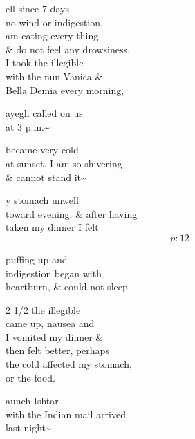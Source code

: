 \documentclass{report}
\begin{document}
	\par{
 	ell since 7 days\ \\no wind or indigestion,\ \\am eating every thing\ \\\& do not feel any drowsiness.\ \\I took the \lbrack illegible\rbrack\ \\with the nun Vanica \&\ \\Bella Demia every morning,\ \\
	}

	\par{
 	ayegh called on us\ \\at 3 p.m.\~{}\ \\
	}

	\par{
 	became very cold\ \\at sunset. I am so shivering\ \\\& cannot stand it\~{}\ \\
	}

	\par{
 	y stomach unwell\ \\toward evening, \& after having\ \\taken my dinner I felt\ \\
  \[p: 12 \]

	}





	\par{
 	puffing up and\ \\indigestion began with\ \\heartburn, \& could not sleep\ \\
	}


	\par{
 	2 1/2 the \lbrack illegible\rbrack\ \\came up, nausea and\ \\I vomited my dinner \&\ \\then felt better, perhaps\ \\the cold affected my stomach,\ \\or the food.\ \\
	}

	\par{
 	aunch Ishtar\ \\with the Indian mail arrived\ \\last night\~{}\ \\
	}
\end{document}
